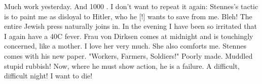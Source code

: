 Much work yesterday. And 1000 . I don't want to repeat it again: Stennes's tactic is to paint me as disloyal to Hitler, who he [!] wants to save from me. Bleh! The entire Jewish press naturally joins in. In the evening I have been so irritated that I again have a 40C fever. Frau von Dirksen comes at midnight and is touchingly concerned, like a mother. I love her very much. She also comforts me. Stennes comes with his new paper. "Workers, Farmers, Soldiers!" Poorly made. Muddled stupid rubbish! Now, where he must show action, he is a failure. A difficult, difficult night! I want to die!